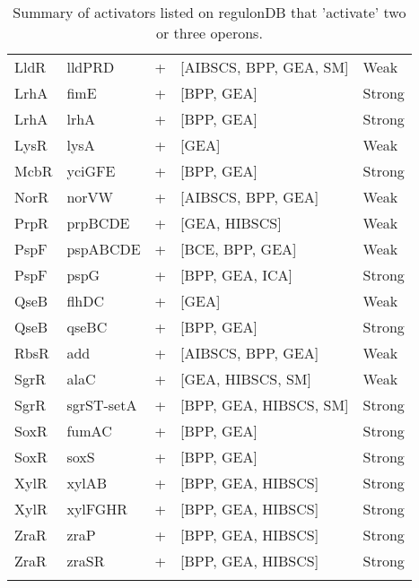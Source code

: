 \documentclass[12pt]{article}
\begin{document}
{\begin{longtable}[c]{lllll}
 LldR &         lldPRD &          + &          [AIBSCS, BPP, GEA, SM] &                Weak \\
 LrhA &           fimE &          + &                      [BPP, GEA] &              Strong \\
 LrhA &           lrhA &          + &                      [BPP, GEA] &              Strong \\
 LysR &           lysA &          + &                           [GEA] &                Weak \\
 McbR &         yciGFE &          + &                      [BPP, GEA] &              Strong \\
 NorR &          norVW &          + &              [AIBSCS, BPP, GEA] &                Weak \\
 PrpR &        prpBCDE &          + &                   [GEA, HIBSCS] &                Weak \\
 PspF &       pspABCDE &          + &                 [BCE, BPP, GEA] &                Weak \\
 PspF &           pspG &          + &                 [BPP, GEA, ICA] &              Strong \\
 QseB &          flhDC &          + &                           [GEA] &                Weak \\
 QseB &          qseBC &          + &                      [BPP, GEA] &              Strong \\
 RbsR &            add &          + &              [AIBSCS, BPP, GEA] &                Weak \\
 SgrR &           alaC &          + &               [GEA, HIBSCS, SM] &                Weak \\
 SgrR &     sgrST-setA &          + &          [BPP, GEA, HIBSCS, SM] &              Strong \\
 SoxR &          fumAC &          + &                      [BPP, GEA] &              Strong \\
 SoxR &           soxS &          + &                      [BPP, GEA] &              Strong \\
 XylR &          xylAB &          + &              [BPP, GEA, HIBSCS] &              Strong \\
 XylR &        xylFGHR &          + &              [BPP, GEA, HIBSCS] &              Strong \\
 ZraR &           zraP &          + &              [BPP, GEA, HIBSCS] &              Strong \\
 ZraR &          zraSR &          + &              [BPP, GEA, HIBSCS] &              Strong \\
\bottomrule
\caption{Summary of activators listed on regulonDB that 'activate' two or three operons.}
\end{longtable}}
\end{document}
